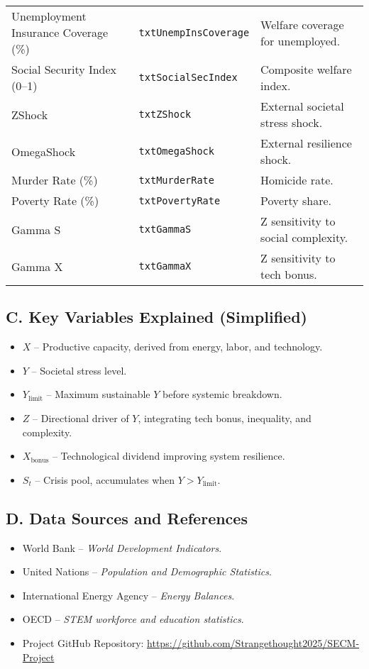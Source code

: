 \documentclass[12pt,a4paper]{article}
\begin{document}
\begin{longtable}{p{4cm} p{4cm} p{7cm}}
Unemployment Insurance Coverage (\%) & \texttt{txtUnempInsCoverage} & Welfare coverage for unemployed. \\
Social Security Index (0–1) & \texttt{txtSocialSecIndex} & Composite welfare index. \\
ZShock & \texttt{txtZShock} & External societal stress shock. \\
OmegaShock & \texttt{txtOmegaShock} & External resilience shock. \\
Murder Rate (\%) & \texttt{txtMurderRate} & Homicide rate. \\
Poverty Rate (\%) & \texttt{txtPovertyRate} & Poverty share. \\
Gamma S & \texttt{txtGammaS} & Z sensitivity to social complexity. \\
Gamma X & \texttt{txtGammaX} & Z sensitivity to tech bonus. \\
\bottomrule
\end{longtable}

\subsection{C. Key Variables Explained (Simplified)}
\begin{itemize}
    \item \(X\) – Productive capacity, derived from energy, labor, and technology.
    \item \(Y\) – Societal stress level.
    \item \(Y_{\text{limit}}\) – Maximum sustainable \(Y\) before systemic breakdown.
    \item \(Z\) – Directional driver of \(Y\), integrating tech bonus, inequality, and complexity.
    \item \(X_{\text{bonus}}\) – Technological dividend improving system resilience.
    \item \(S_t\) – Crisis pool, accumulates when \(Y > Y_{\text{limit}}\).
\end{itemize}

\subsection{D. Data Sources and References}
\begin{itemize}
    \item World Bank – \textit{World Development Indicators}.
    \item United Nations – \textit{Population and Demographic Statistics}.
    \item International Energy Agency – \textit{Energy Balances}.
    \item OECD – \textit{STEM workforce and education statistics}.
    \item Project GitHub Repository: \url{https://github.com/Strangethought2025/SECM-Project}
\end{itemize}

\newpage

\end{document}
